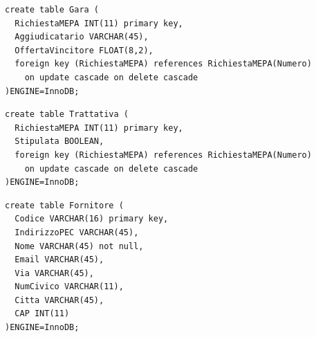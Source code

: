 \begin{verbatim}
create table Gara (
  RichiestaMEPA INT(11) primary key,
  Aggiudicatario VARCHAR(45),
  OffertaVincitore FLOAT(8,2),
  foreign key (RichiestaMEPA) references RichiestaMEPA(Numero)
    on update cascade on delete cascade
)ENGINE=InnoDB;
\end{verbatim}
\vspace{0.5cm}

\noindent{}
\newline\newline

\begin{verbatim}
create table Trattativa (
  RichiestaMEPA INT(11) primary key,
  Stipulata BOOLEAN,
  foreign key (RichiestaMEPA) references RichiestaMEPA(Numero)
    on update cascade on delete cascade
)ENGINE=InnoDB;
\end{verbatim}
\vspace{0.5cm}

\noindent{}
\newline\newline

\begin{verbatim}
create table Fornitore (
  Codice VARCHAR(16) primary key,
  IndirizzoPEC VARCHAR(45),
  Nome VARCHAR(45) not null,
  Email VARCHAR(45),
  Via VARCHAR(45),
  NumCivico VARCHAR(11),
  Citta VARCHAR(45),
  CAP INT(11)
)ENGINE=InnoDB;
\end{verbatim}
\vspace{0.5cm}

\noindent{}
\newline\newline

